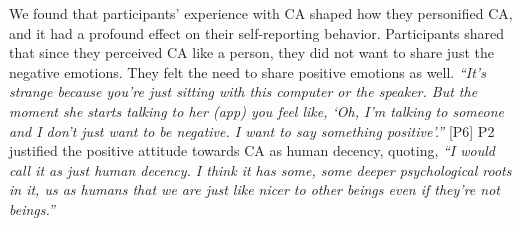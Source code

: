             We found that participants' experience with \ac{CA} shaped how they personified \ac{CA}, and it had a profound effect on their self-reporting behavior.
            Participants shared that since they perceived \ac{CA} like a person, they did not want to share just the negative emotions. They felt the need to share positive emotions as well. 
                \textit{``It's strange because you're just sitting with this computer or the speaker. But the moment she starts talking to her (\acl{app}) you feel like, `Oh, I'm talking to someone and I don't just want to be negative. I want to say something positive'.''}
                [P6]
            P2 justified the positive attitude towards \ac{CA} as human decency, quoting,
                \textit{
                ``I would call it as just human decency. I think it has some, some deeper psychological roots in it, us as humans that we are just like nicer to other beings even if they're not beings.''
                }
            

